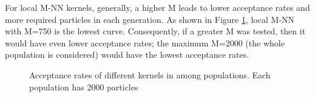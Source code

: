 For local M-NN kernels, generally, a higher M leads to lower acceptance rates and more required particles in each generation. As shown in Figure \ref{fig:acceptance1}, local M-NN with M=750 is the lowest curve. Consequently, if a greater M was tested, then it would have even lower acceptance rates; the maximum M=2000 (the whole population is considered) would have the lowest acceptance rates.

\begin{figure}
    \begin{center}
    \end{center}

    \caption[Total required number of samples for different kernels]%
    {Total required number of samples of different kernels after 20 populations (2000 particles in each population). Different color represents different generations (bottom to top: population 1 to population 20)}
    \label{fig:kernel1}

    \vspace*{\floatsep}

    \begin{center}
    \end{center}

    \caption[Acceptance rates of different kernels]%
    {Acceptance rates of different kernels in among populations. Each population has 2000 particles}
    \label{fig:acceptance1}

\end{figure}

